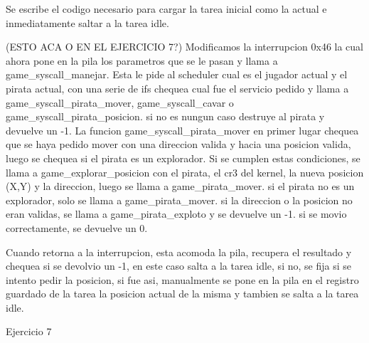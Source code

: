 Se escribe el codigo necesario para cargar la tarea inicial como la actual e inmediatamente saltar a la tarea idle.

(ESTO ACA O EN EL EJERCICIO 7?)
Modificamos la interrupcion 0x46 la cual ahora pone en la pila los parametros que se le pasan
y llama a game_syscall_manejar. Esta le pide al scheduler cual es el jugador actual y el pirata actual,
con una serie de ifs chequea cual fue el servicio pedido y llama a game_syscall_pirata_mover, game_syscall_cavar o
game_syscall_pirata_posicion. si no es nungun caso destruye al pirata y devuelve un -1.
  La funcion game_syscall_pirata_mover en primer lugar chequea que se haya pedido mover con una
  direccion valida y hacia una posicion valida, luego se chequea si el pirata es un explorador.
  Si se cumplen estas condiciones, se llama a game_explorar_posicion con el pirata, el cr3 del kernel, la nueva
  posicion (X,Y) y la direccion, luego se llama a game_pirata_mover. si el pirata no es un explorador,
  solo se llama a game_pirata_mover. si la direccion o la posicion no eran validas, se llama a game_pirata_exploto
  y se devuelve un -1. si se movio correctamente, se devuelve un 0.

Cuando retorna a la interrupcion, esta acomoda la pila, recupera el resultado y chequea si se devolvio un -1,
en este caso salta a la tarea idle, si no, se fija si se intento pedir la posicion, si fue asi, manualmente se
pone en la pila en el registro guardado de la tarea la posicion actual de la misma y tambien se salta a la tarea idle.


Ejercicio 7

